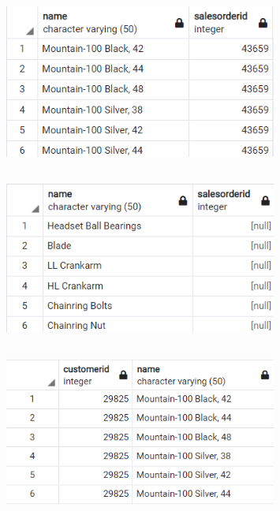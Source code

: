 \documentclass{article}
\begin{document}
\subsection{}
\begin{figure}[H]
    \centering
    \includegraphics[width=0.8\textwidth]{figures/5-a.png}
    \caption
	{
	}
    \label{fig:fig1}
\end{figure}

\subsection{}
\begin{figure}[H]
    \centering
    \includegraphics[width=0.8\textwidth]{figures/5-b.png}
    \caption
	{
	}
    \label{fig:fig1}
\end{figure}

\subsection{}
\begin{figure}[H]
    \centering
    \includegraphics[width=0.8\textwidth]{figures/5-c.png}
    \caption
	{
	}
    \label{fig:fig1}
\end{figure}
\end{document}
